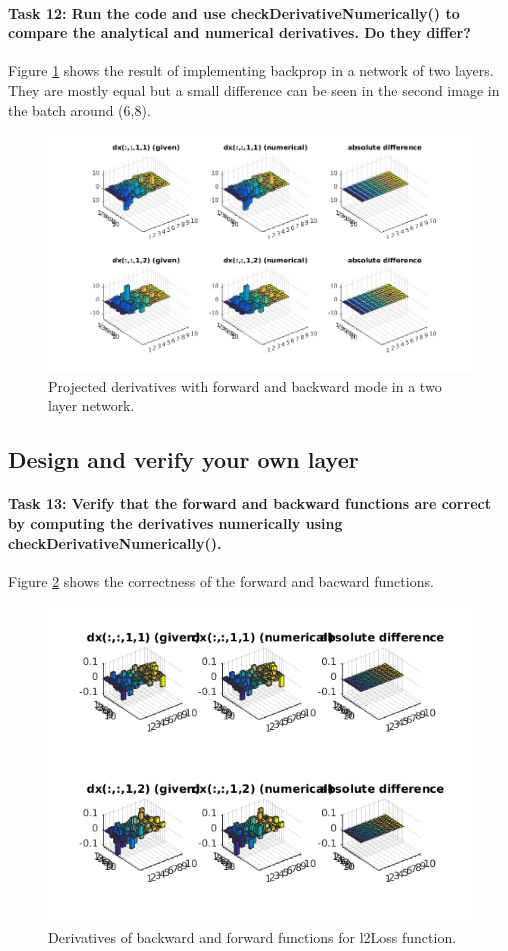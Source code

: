 \documentclass[12pt]{article}
\begin{document}
\paragraph{Task 12: Run the code and use checkDerivativeNumerically() to compare the analytical and numerical derivatives. Do they differ?} Figure \ref{fig:22a} shows the result of implementing backprop in a network of two layers. They are mostly equal but a small difference can be seen in the second image in the batch around (6,8).
\begin{figure}[htbp]
 \centering
\includegraphics[width=\textwidth]{22a}
\caption{Projected derivatives with forward and backward mode in a two layer network.}
 \label{fig:22a}
\end{figure}

\subsection{Design and verify your own layer}
\paragraph{Task 13: Verify that the forward and backward functions are correct by computing the derivatives numerically using checkDerivativeNumerically().} Figure \ref{fig:23a} shows the correctness of the forward and bacward functions.
\begin{figure}[htbp]
 \centering
\includegraphics[width=\textwidth]{23a}
\caption{Derivatives of backward and forward functions for l2Loss function.}
 \label{fig:23a}
\end{figure}
\end{document}

